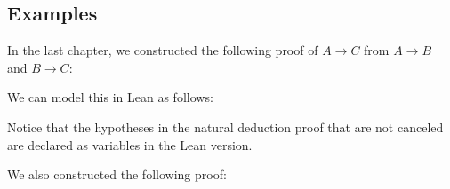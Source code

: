 \documentclass[letterpaper,10pt,english]{sphinxmanual}
\begin{document}
\begin{sphinxVerbatim}[commandchars=\\\{\}]
   

     
         
         
\end{sphinxVerbatim}


\subsection{Examples}
\label{\detokenize{propositional_logic_in_lean:examples}}
\sphinxAtStartPar
In the last chapter, we constructed the following proof of \(A \to C\) from \(A \to B\) and \(B \to C\):



\begin{center}
\AXM{}
\DP
\end{center}

\sphinxAtStartPar
We can model this in Lean as follows:

\begin{sphinxVerbatim}[commandchars=\\\{\}]
     
     

     
    
     
\end{sphinxVerbatim}

\sphinxAtStartPar
Notice that the hypotheses in the natural deduction proof that are not canceled are declared as variables in the Lean version.

\sphinxAtStartPar
We also constructed the following proof:



\begin{center}
\AXM{}
\AXM{}
\AXM{}
\DP
\end{center}
\end{document}
